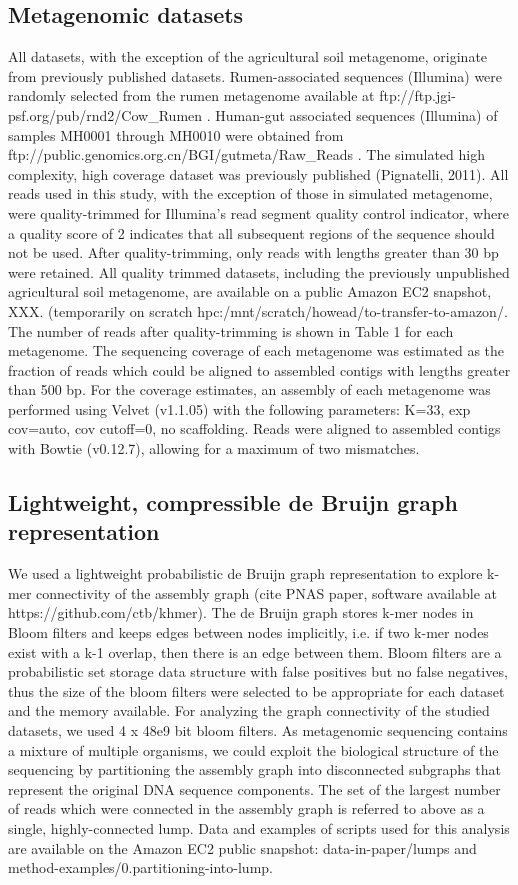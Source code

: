 \documentclass[10pt]{article}
\begin{document}
\subsection*{Metagenomic datasets}
All datasets, with the exception of the agricultural soil metagenome, originate from previously published datasets. Rumen-associated sequences (Illumina) were randomly selected from the rumen metagenome available at ftp://ftp.jgi-psf.org/pub/rnd2/Cow\_Rumen \cite{Hess:2011p686}. Human-gut associated sequences (Illumina) of samples MH0001 through MH0010 were obtained from ftp://public.genomics.org.cn/BGI/gutmeta/Raw\_Reads \cite{Qin:2010p189}.  The simulated high complexity, high coverage dataset was previously published (Pignatelli, 2011).  All reads used in this study, with the exception of those in simulated metagenome, were quality-trimmed for Illumina's read segment quality control indicator, where a quality score of 2 indicates that all subsequent regions of the sequence should not be used. After quality-trimming, only reads with lengths greater than 30 bp were retained. All quality trimmed datasets, including the previously unpublished agricultural soil metagenome, are available on a public Amazon EC2 snapshot, XXX. (temporarily on scratch hpc:/mnt/scratch/howead/to-transfer-to-amazon/.   The number of reads after quality-trimming is shown in Table 1 for each metagenome.  The sequencing coverage of each metagenome was estimated as the fraction of reads which could be aligned to assembled contigs with lengths greater than 500 bp.  For the coverage estimates, an assembly of each metagenome was performed using Velvet (v1.1.05) with the following parameters:  K=33, exp cov=auto, cov cutoff=0, no scaffolding.  Reads were aligned to assembled contigs with Bowtie (v0.12.7), allowing for a maximum of two mismatches.  

\subsection*{Lightweight, compressible de Bruijn graph representation}
We used a lightweight probabilistic de Bruijn graph representation to explore k-mer connectivity of the assembly graph (cite PNAS paper, software available at https://github.com/ctb/khmer). The de Bruijn graph stores k-mer nodes in Bloom filters and keeps edges between nodes implicitly, i.e. if two k-mer nodes exist with a k-1 overlap, then there is an edge between them. Bloom filters are a probabilistic set storage data structure with false positives but no false negatives, thus the size of the bloom filters were selected to be appropriate for each dataset and the memory available.  For analyzing the graph connectivity of the studied datasets, we used 4 x 48e9 bit bloom filters.  As metagenomic sequencing contains a mixture of multiple organisms, we could exploit the biological structure of the sequencing by partitioning the assembly graph into disconnected subgraphs that represent the original DNA sequence components. The set of the largest number of reads which were connected in the assembly graph is referred to above as a single, highly-connected lump.  Data and examples of scripts used for this analysis are available on the Amazon EC2 public snapshot:  data-in-paper/lumps and method-examples/0.partitioning-into-lump.
\end{document}
